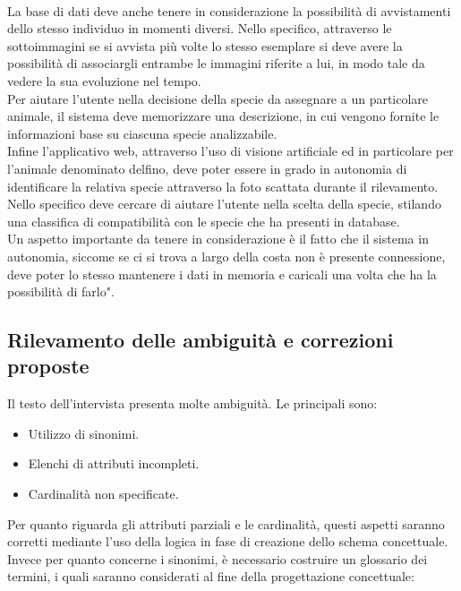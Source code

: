 \documentclass[a4paper,final,12pt]{report}
\begin{document}
\\
La base di dati deve anche tenere in considerazione la possibilità di avvistamenti dello stesso individuo in momenti diversi. Nello specifico, attraverso le sottoimmagini se si avvista più volte lo stesso esemplare si deve avere la possibilità di associargli entrambe le immagini riferite a lui, in modo tale da vedere la sua evoluzione nel tempo.
\\
Per aiutare l'utente nella decisione della specie da assegnare a un particolare animale, il sistema deve memorizzare una descrizione, in cui vengono fornite le informazioni base su ciascuna specie analizzabile.
\\
Infine l'applicativo web, attraverso l'uso di visione artificiale ed in particolare per l'animale denominato delfino, deve poter essere in grado in autonomia di identificare la relativa specie attraverso la foto scattata durante il rilevamento. Nello specifico deve cercare di aiutare l'utente nella scelta della specie, stilando una classifica di compatibilità con le specie che ha presenti in database.
\\
Un aspetto importante da tenere in considerazione è il fatto che il sistema in autonomia, siccome se ci si trova a largo della costa non è presente connessione, deve poter lo stesso mantenere i dati in memoria e caricali una volta che ha la possibilità di farlo".

\subsection{Rilevamento delle ambiguità e correzioni proposte}
Il testo dell'intervista presenta molte ambiguità. Le principali sono:
\begin{itemize}
\item Utilizzo di sinonimi.
\item Elenchi di attributi incompleti.
\item Cardinalità non specificate.
\end{itemize}

Per quanto riguarda gli attributi parziali e le cardinalità, questi aspetti saranno corretti mediante l'uso della logica in fase di creazione dello schema concettuale. Invece per quanto concerne i sinonimi, è necessario costruire un glossario dei termini, i quali saranno considerati al fine della progettazione concettuale:
\end{document}
